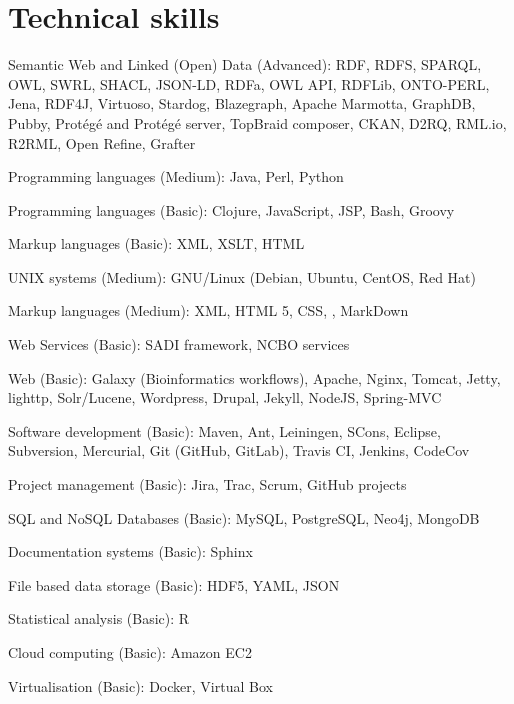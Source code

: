 \documentclass[11pt,fullpage]{article}
\renewenvironment{itemize}{
  \begin{list}{}{
    \setlength{\leftmargin}{1.5em}
  }
}{
  \end{list}
}
\begin{document}
\section*{Technical skills}
\begin{itemize}
	\item Semantic Web and Linked (Open) Data (Advanced): RDF, RDFS, SPARQL, OWL, SWRL, SHACL, JSON-LD, RDFa, OWL API, RDFLib, ONTO-PERL, Jena, RDF4J, Virtuoso, Stardog, Blazegraph, Apache Marmotta, GraphDB, Pubby, Prot\'eg\'e and Prot\'eg\'e server, TopBraid composer, CKAN, D2RQ, RML.io, R2RML, Open Refine, Grafter
	\item Programming languages (Medium): Java, Perl, Python
	\item Programming languages (Basic): Clojure, JavaScript, JSP, Bash, Groovy
  \item Markup languages (Basic): XML, XSLT, HTML
	\item UNIX systems (Medium): GNU/Linux (Debian, Ubuntu, CentOS, Red Hat)
	\item Markup languages (Medium): XML, HTML 5, CSS, \LaTeXe, MarkDown
	\item Web Services (Basic): SADI framework, NCBO services
	\item Web (Basic): Galaxy (Bioinformatics workflows), Apache, Nginx, Tomcat, Jetty, lighttp, Solr/Lucene, Wordpress, Drupal, Jekyll, NodeJS, Spring-MVC
	\item Software development (Basic): Maven, Ant, Leiningen, SCons, Eclipse, Subversion, Mercurial, Git (GitHub, GitLab), Travis CI, Jenkins, CodeCov
	\item Project management (Basic): Jira, Trac, Scrum, GitHub projects
	\item SQL and NoSQL Databases (Basic): MySQL, PostgreSQL, Neo4j, MongoDB
  \item Documentation systems (Basic): Sphinx
	\item File based data storage (Basic): HDF5, YAML, JSON
	\item Statistical analysis (Basic): R
	\item Cloud computing (Basic): Amazon EC2
	\item Virtualisation (Basic): Docker, Virtual Box
\end{itemize}
\end{document}

